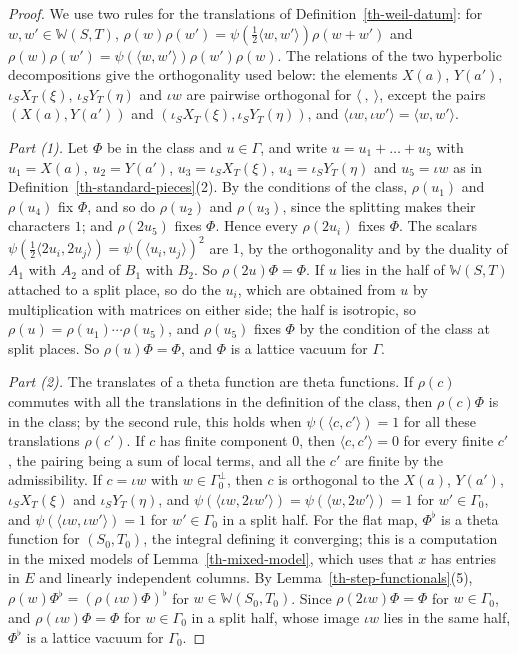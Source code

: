 \begin{proof}
We use two rules for the translations of Definition~\ref{th-weil-datum}: for
$w,w'\in\mathbb W(S,T)$,
$\rho(w)\rho(w')=\psi(\tfrac12\langle w,w'\rangle)\rho(w+w')$ and
$\rho(w)\rho(w')=\psi(\langle w,w'\rangle)\rho(w')\rho(w)$. The relations of the
two hyperbolic decompositions give the orthogonality used below: the elements
$X(a)$, $Y(a')$, $\iota_SX_T(\xi)$, $\iota_SY_T(\eta)$ and $\iota w$ are pairwise
orthogonal for $\langle\ ,\ \rangle$, except the pairs $(X(a),Y(a'))$ and
$(\iota_SX_T(\xi),\iota_SY_T(\eta))$, and
$\langle\iota w,\iota w'\rangle=\langle w,w'\rangle$.

\emph{Part (1).} Let $\Phi$ be in the class and $u\in\Gamma$, and write
$u=u_1+\dots+u_5$ with $u_1=X(a)$, $u_2=Y(a')$, $u_3=\iota_SX_T(\xi)$,
$u_4=\iota_SY_T(\eta)$ and $u_5=\iota w$ as in
Definition~\ref{th-standard-pieces}(2). By the conditions of the class,
$\rho(u_1)$ and $\rho(u_4)$ fix $\Phi$, and so do $\rho(u_2)$ and $\rho(u_3)$,
since the splitting makes their characters $1$; and $\rho(2u_5)$ fixes $\Phi$.
Hence every $\rho(2u_i)$ fixes $\Phi$. The scalars
$\psi(\tfrac12\langle 2u_i,2u_j\rangle)=\psi(\langle u_i,u_j\rangle)^2$ are $1$,
by the orthogonality and by the duality of $A_1$ with $A_2$ and of $B_1$ with
$B_2$. So $\rho(2u)\Phi=\Phi$. If $u$ lies in the half of $\mathbb W(S,T)$
attached to a split place, so do the $u_i$, which are obtained from $u$ by
multiplication with matrices on either side; the half is isotropic, so
$\rho(u)=\rho(u_1)\cdots\rho(u_5)$, and $\rho(u_5)$ fixes $\Phi$ by the condition
of the class at split places. So $\rho(u)\Phi=\Phi$, and $\Phi$ is a lattice
vacuum for $\Gamma$.

\emph{Part (2).} The translates of a theta function are theta functions. If
$\rho(c)$ commutes with all the translations in the definition of the class,
then $\rho(c)\Phi$ is in the class; by the second rule, this holds when
$\psi(\langle c,c'\rangle)=1$ for all these translations $\rho(c')$. If $c$ has
finite component $0$, then $\langle c,c'\rangle=0$ for every finite $c'$, the
pairing being a sum of local terms, and all the $c'$ are finite by the
admissibility. If $c=\iota w$ with $w\in\Gamma_0^\perp$, then $c$ is orthogonal
to the $X(a)$, $Y(a')$, $\iota_SX_T(\xi)$ and $\iota_SY_T(\eta)$, and
$\psi(\langle\iota w,2\iota w'\rangle)=\psi(\langle w,2w'\rangle)=1$ for
$w'\in\Gamma_0$, and $\psi(\langle\iota w,\iota w'\rangle)=1$ for $w'\in\Gamma_0$
in a split half. For the flat map, $\Phi^\flat$ is a theta function for
$(S_0,T_0)$, the integral defining it converging; this is a computation in the
mixed models of Lemma~\ref{th-mixed-model}, which uses that $x$ has entries in
$E$ and linearly independent columns. By Lemma~\ref{th-step-functionals}(5),
$\rho(w)\Phi^\flat=(\rho(\iota w)\Phi)^\flat$ for $w\in\mathbb W(S_0,T_0)$. Since
$\rho(2\iota w)\Phi=\Phi$ for $w\in\Gamma_0$, and $\rho(\iota w)\Phi=\Phi$ for
$w\in\Gamma_0$ in a split half, whose image $\iota w$ lies in the same half,
$\Phi^\flat$ is a lattice vacuum for $\Gamma_0$.


\end{proof}
